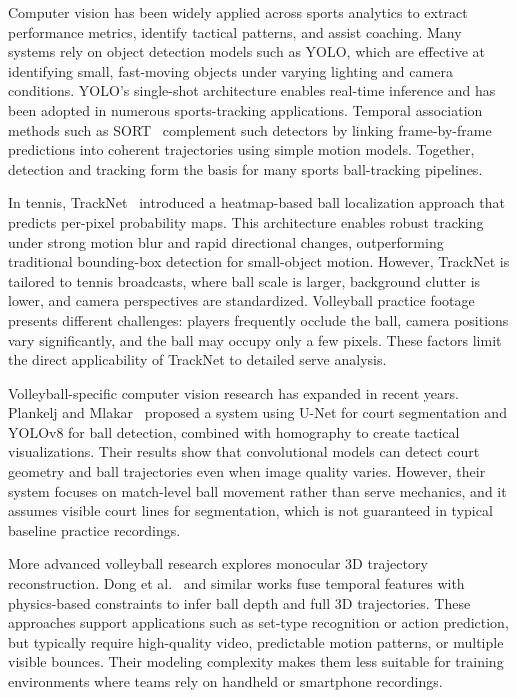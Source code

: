 Computer vision has been widely applied across sports analytics to extract performance metrics, identify tactical patterns, and assist coaching. Many systems rely on object detection models such as YOLO, which are effective at identifying small, fast-moving objects under varying lighting and camera conditions. YOLO’s single-shot architecture enables real-time inference and has been adopted in numerous sports-tracking applications. Temporal association methods such as SORT~\cite{sort} complement such detectors by linking frame-by-frame predictions into coherent trajectories using simple motion models. Together, detection and tracking form the basis for many sports ball-tracking pipelines.

In tennis, TrackNet~\cite{tracknet} introduced a heatmap-based ball localization approach that predicts per-pixel probability maps. This architecture enables robust tracking under strong motion blur and rapid directional changes, outperforming traditional bounding-box detection for small-object motion. However, TrackNet is tailored to tennis broadcasts, where ball scale is larger, background clutter is lower, and camera perspectives are standardized. Volleyball practice footage presents different challenges: players frequently occlude the ball, camera positions vary significantly, and the ball may occupy only a few pixels. These factors limit the direct applicability of TrackNet to detailed serve analysis.

Volleyball-specific computer vision research has expanded in recent years. Plankelj and Mlakar~\cite{plankelj2024} proposed a system using U-Net for court segmentation and YOLOv8 for ball detection, combined with homography to create tactical visualizations. Their results show that convolutional models can detect court geometry and ball trajectories even when image quality varies. However, their system focuses on match-level ball movement rather than serve mechanics, and it assumes visible court lines for segmentation, which is not guaranteed in typical baseline practice recordings.

More advanced volleyball research explores monocular 3D trajectory reconstruction. Dong et al.~\cite{dong2021} and similar works fuse temporal features with physics-based constraints to infer ball depth and full 3D trajectories. These approaches support applications such as set-type recognition or action prediction, but typically require high-quality video, predictable motion patterns, or multiple visible bounces. Their modeling complexity makes them less suitable for training environments where teams rely on handheld or smartphone recordings.

